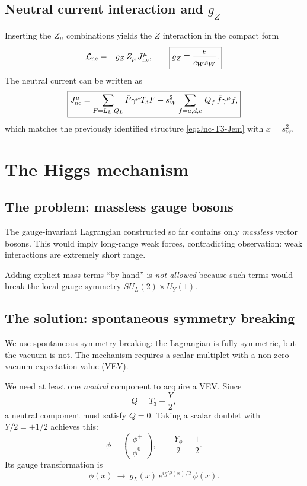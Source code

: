 \subsection{Neutral current interaction and $g_Z$}
Inserting the $Z_\mu$ combinations yields the $Z$ interaction in the compact form
\begin{equation}
\mathcal L_{\rm nc} = -g_Z\,Z_\mu\,J^\mu_{\rm nc},
\qquad
\boxed{
g_Z\equiv \frac{e}{c_W s_W}.
}
\label{eq:gZ}
\end{equation}
The neutral current can be written as
\begin{equation}
\boxed{
J^\mu_{\rm nc}
=
\sum_{F=L_L,Q_L}\bar F\gamma^\mu T_3 F
-
s_W^2 \sum_{f=u,d,e}\,Q_f\,\bar f\gamma^\mu f,
}
\label{eq:Jnc-final}
\end{equation}
which matches the previously identified structure \eqref{eq:Jnc-T3-Jem} with $x=s_W^2$.

\section{The Higgs mechanism}
\subsection{The problem: massless gauge bosons}
The gauge-invariant Lagrangian constructed so far contains only \emph{massless} vector bosons. This would imply long-range weak forces, contradicting observation: weak interactions are extremely short range.

Adding explicit mass terms ``by hand'' is \emph{not allowed} because such terms would break the local gauge symmetry $SU_L(2)\times U_Y(1)$.

\subsection{The solution: spontaneous symmetry breaking}
We use spontaneous symmetry breaking: the Lagrangian is fully symmetric, but the vacuum is not. The mechanism requires a scalar multiplet with a non-zero vacuum expectation value (VEV).

We need at least one \emph{neutral} component to acquire a VEV. Since
\[
Q=T_3+\frac{Y}{2},
\]
a neutral component must satisfy $Q=0$. Taking a scalar doublet with $Y/2=+1/2$ achieves this:
\begin{equation}
\boxed{
\phi=
\begin{pmatrix}
\phi^+\\
\phi^0
\end{pmatrix},
\qquad
\frac{Y_\phi}{2}=\frac{1}{2}.
}
\label{eq:Higgs-doublet}
\end{equation}
Its gauge transformation is
\begin{equation}
\phi(x)\ \longrightarrow\ g_L(x)\,e^{ig'\theta(x)/2}\,\phi(x).
\end{equation}

